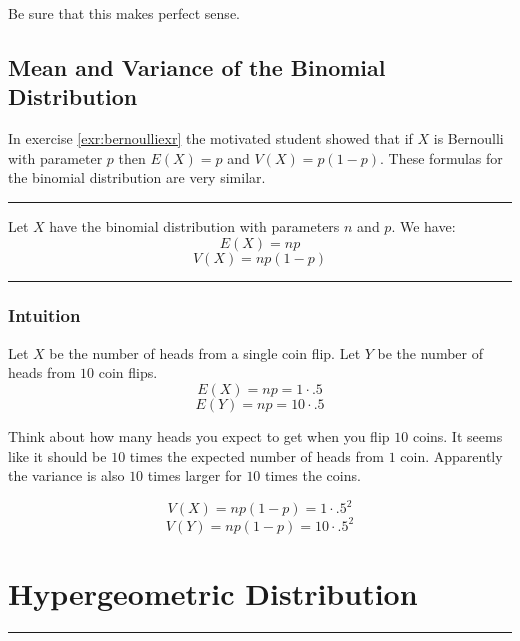 \documentclass[
]{book}
\theoremstyle{definition}
\theoremstyle{definition}
\theoremstyle{definition}
\theoremstyle{remark}
\let\BeginKnitrBlock\begin \let\EndKnitrBlock\end
\begin{document}
Be sure that this makes perfect sense.

\hypertarget{mean-and-variance-of-the-binomial-distribution}{%
\subsection{Mean and Variance of the Binomial Distribution}\label{mean-and-variance-of-the-binomial-distribution}}

In exercise \ref{exr:bernoulliexr} the motivated student showed that if \(X\) is Bernoulli with parameter \(p\) then \(E(X) = p\) and \(V(X) = p(1-p)\). These formulas for the binomial distribution are very similar.

\begin{center}\rule{0.5\linewidth}{0.5pt}\end{center}

\BeginKnitrBlock{theorem}[Binomial Distribution]
\protect\hypertarget{thm:unnamed-chunk-21}{}{\label{thm:unnamed-chunk-21} {} }Let \(X\) have the binomial distribution with parameters \(n\) and \(p\). We have:
\[E(X) = np\]
\[V(X) = np(1-p)\]
\EndKnitrBlock{theorem}

\begin{center}\rule{0.5\linewidth}{0.5pt}\end{center}

\hypertarget{intuition}{%
\subsubsection{Intuition}\label{intuition}}

Let \(X\) be the number of heads from a single coin flip. Let \(Y\) be the number of heads from \(10\) coin flips.
\[E(X)=np=1 \cdot .5\]
\[E(Y)=np=10 \cdot .5\]

Think about how many heads you expect to get when you flip \(10\) coins. It seems like it should be \(10\) times the expected number of heads from \(1\) coin. Apparently the variance is also \(10\) times larger for \(10\) times the coins.

\[V(X)=np(1-p)=1 \cdot .5^2\]
\[V(Y)=np(1-p)=10 \cdot .5^2\]

\hypertarget{hypergeometric-distribution}{%
\section{Hypergeometric Distribution}\label{hypergeometric-distribution}}

\begin{center}\rule{0.5\linewidth}{0.5pt}\end{center}
\end{document}
